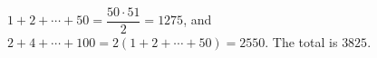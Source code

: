 $1+2+\cdots+50=\dfrac{50\cdot51}{2}=1275$, and $2+4+\cdots+100=2(1+2+\cdots+50)=2550$. The total is $\boxed{3825}$.
